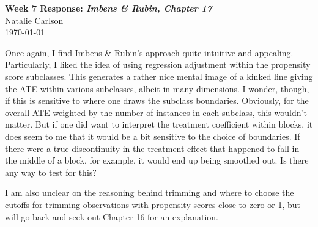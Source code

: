 \documentclass[12pt]{article}
\begin{document}
\begin{center}
  \Large \textbf{Week 7 Response: \textit{Imbens \& Rubin, Chapter 17}} \\
  \vspace{0.1in}
  \normalsize Natalie Carlson \\
  \today
\end{center}

Once again, I find Imbens \& Rubin's approach quite intuitive and appealing. Particularly, I liked the idea of using regression adjustment within the propensity score subclasses. This generates a rather nice mental image of a kinked line giving the ATE within various subclasses, albeit in many dimensions. I wonder, though, if this is sensitive to where one draws the subclass boundaries. Obviously, for the overall ATE weighted by the number of instances in each subclass, this wouldn't matter. But if one did want to interpret the treatment coefficient within blocks, it does seem to me that it would be a bit sensitive to the choice of boundaries. If there were a true discontinuity in the treatment effect that happened to fall in the middle of a block, for example, it would end up being smoothed out. Is there any way to test for this?

I am also unclear on the reasoning behind trimming and where to choose the cutoffs for trimming observations with propensity scores close to zero or 1, but will go back and seek out Chapter 16 for an explanation.
\end{document}
